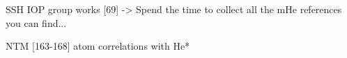 				SSH IOP group works [69] -> Spend the time to collect all the mHe references you can find...
		
		NTM [163-168] atom correlations with He* 

